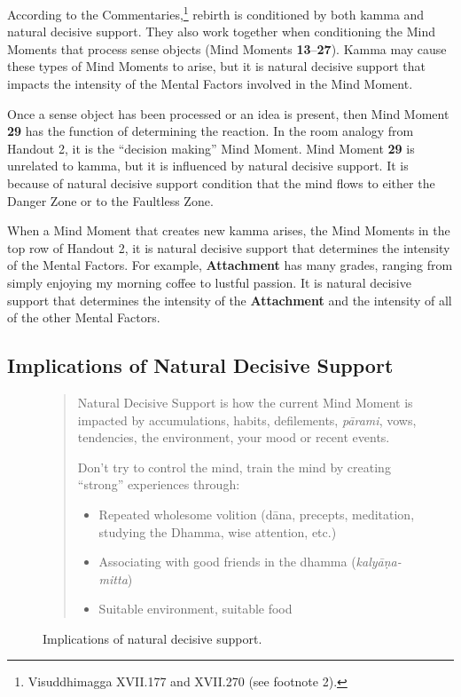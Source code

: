 According to the Commentaries,\footnote{Visuddhimagga XVII.177 and XVII.270 (see footnote 2).} rebirth is conditioned by both kamma and natural decisive support. They also work together when conditioning the Mind Moments that process sense objects (Mind Moments \textbf{13}--\textbf{27}). Kamma may cause these types of Mind Moments to arise, but it is natural decisive support that impacts the intensity of the Mental Factors involved in the Mind Moment.

Once a sense object has been processed or an idea is present, then Mind Moment \textbf{29} has the function of determining the reaction. In the room analogy from Handout 2, it is the “decision making” Mind Moment. Mind Moment \textbf{29} is unrelated to kamma, but it is influenced by natural decisive support. It is because of natural decisive support condition that the mind flows to either the Danger Zone or to the Faultless Zone.

When a Mind Moment that creates new kamma arises, the Mind Moments in the top row of Handout 2, it is natural decisive support that determines the intensity of the Mental Factors. For example, \textbf{Attachment} has many grades, ranging from simply enjoying my morning coffee to lustful passion. It is natural decisive support that determines the intensity of the \textbf{Attachment} and the intensity of all of the other Mental Factors.

\subsection*{Implications of Natural Decisive Support}

\begin{figure}[H]
\begin{quotation}
Natural Decisive Support is how the current Mind Moment is impacted by accumulations, habits, defilements, \textit{pārami}, vows, tendencies, the environment, your mood or recent events.

Don’t try to control the mind, train the mind by creating “strong” experiences through:

\begin{itemize}

\item Repeated wholesome volition (dāna, precepts, meditation, studying the Dhamma, wise attention, etc.)

\item Associating with good friends in the dhamma (\textit{kalyāṇa-mitta})

\item Suitable environment, suitable food

\end{itemize}
\end{quotation}
\caption{Implications of natural decisive support.}
\label{fig:Implications}
\end{figure}

